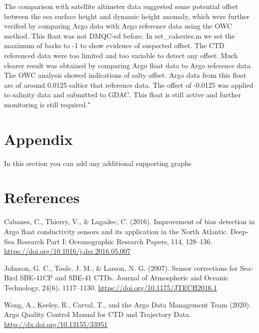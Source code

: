 \documentclass{article}
\begin{document}
\begin{flushleft}
\medskip
The comparison with satellite altimeter data suggested some potential offset between the sea surface height and dynamic height anomaly, which were further verified by comparing Argo data with Argo reference data using the OWC method. This float was not DMQC-ed before. In set\_calseries.m we set the maximum of barks to -1 to show evidence of suspected offset. The CTD referenced data were too limited and too variable to detect any offset. Much clearer result was obtained by comparing Argo float data to Argo reference data. The OWC analysis showed indications of salty offset. Argo data from this float are of around 0.0125 saltier that reference data. The offset of -0.0125 was  applied to salinity data and submitted to GDAC. This float is still active and further monitoring is still required."

\section{Appendix}
In this section you can add any additional supporting graphs

\section{References}

Cabanes, C., Thierry, V., \& Lagadec, C. (2016). Improvement of bias detection in Argo float conductivity sensors and its application in the North Atlantic. Deep-Sea Research Part I: Oceanographic Research Papers, 114, 128–136. \href{url}{https://doi.org/10.1016/j.dsr.2016.05.007}

\bigskip
Johnson, G. C., Toole, J. M., \& Larson, N. G. (2007). Sensor corrections for Sea-Bird SBE-41CP and SBE-41 CTDs. Journal of Atmospheric and Oceanic Technology, 24(6), 1117–1130. \href{url}{https://doi.org/10.1175/JTECH2016.1}

\bigskip
Wong, A., Keeley, R., Carval, T., and the Argo Data Management Team (2020).
Argo Quality Control Manual for CTD and Trajectory Data.
 \href{url}{http://dx.doi.org/10.13155/33951}

\end{flushleft}
\end{document}
